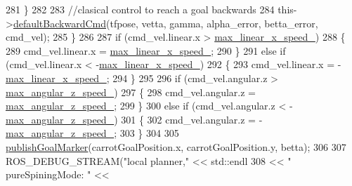 \begin{DoxyCode}
{281                 \}
282 
283                 \textcolor{comment}{//clasical control to reach a goal backwards}
284                 this->\hyperlink{classcl__move__base__z_1_1backward__local__planner_1_1BackwardLocalPlanner_a1ebd69a028a22e3573e98f89d593f97d}{defaultBackwardCmd}(tfpose, vetta, gamma, alpha\_error, betta\_error, 
      cmd\_vel);
285             \}
286 
287             \textcolor{keywordflow}{if} (cmd\_vel.linear.x > \hyperlink{classcl__move__base__z_1_1backward__local__planner_1_1BackwardLocalPlanner_ae4399072e9ae9cc60d8837860dc4807b}{max\_linear\_x\_speed\_})
288             \{
289                 cmd\_vel.linear.x = \hyperlink{classcl__move__base__z_1_1backward__local__planner_1_1BackwardLocalPlanner_ae4399072e9ae9cc60d8837860dc4807b}{max\_linear\_x\_speed\_};
290             \}
291             \textcolor{keywordflow}{else} \textcolor{keywordflow}{if} (cmd\_vel.linear.x < -\hyperlink{classcl__move__base__z_1_1backward__local__planner_1_1BackwardLocalPlanner_ae4399072e9ae9cc60d8837860dc4807b}{max\_linear\_x\_speed\_})
292             \{
293                 cmd\_vel.linear.x = -\hyperlink{classcl__move__base__z_1_1backward__local__planner_1_1BackwardLocalPlanner_ae4399072e9ae9cc60d8837860dc4807b}{max\_linear\_x\_speed\_};
294             \}
295 
296             \textcolor{keywordflow}{if} (cmd\_vel.angular.z > \hyperlink{classcl__move__base__z_1_1backward__local__planner_1_1BackwardLocalPlanner_af7e492339ee2d1c90c00f6dd4cf95551}{max\_angular\_z\_speed\_})
297             \{
298                 cmd\_vel.angular.z = \hyperlink{classcl__move__base__z_1_1backward__local__planner_1_1BackwardLocalPlanner_af7e492339ee2d1c90c00f6dd4cf95551}{max\_angular\_z\_speed\_};
299             \}
300             \textcolor{keywordflow}{else} \textcolor{keywordflow}{if} (cmd\_vel.angular.z < -\hyperlink{classcl__move__base__z_1_1backward__local__planner_1_1BackwardLocalPlanner_af7e492339ee2d1c90c00f6dd4cf95551}{max\_angular\_z\_speed\_})
301             \{
302                 cmd\_vel.angular.z = -\hyperlink{classcl__move__base__z_1_1backward__local__planner_1_1BackwardLocalPlanner_af7e492339ee2d1c90c00f6dd4cf95551}{max\_angular\_z\_speed\_};
303             \}
304 
305             \hyperlink{classcl__move__base__z_1_1backward__local__planner_1_1BackwardLocalPlanner_a70eaeb6cf31fd3378d9fbf9bcb975995}{publishGoalMarker}(carrotGoalPosition.x, carrotGoalPosition.y, betta);
306 
307             ROS\_DEBUG\_STREAM(\textcolor{stringliteral}{"local planner,"} << std::endl
308                                               << \textcolor{stringliteral}{" pureSpiningMode: "} << 
}
\end{DoxyCode}
